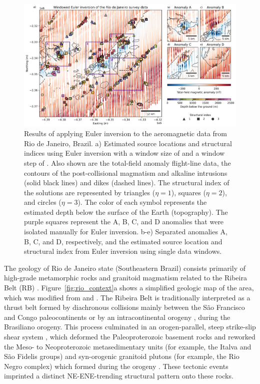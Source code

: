 \begin{figure}[tb!]
\centering
\includegraphics[width=1\linewidth]{figures/real-data-application.png}
\caption{
    Results of applying Euler inversion to the aeromagnetic data from Rio de Janeiro, Brazil. 
    a) Estimated source locations and structural indices using Euler inversion with a window size of \RioWindowSize{} and a window step of \RioWindowStep{}. 
    Also shown are the total-field anomaly flight-line data, the contours of the post-collisional magmatism and alkaline intrusions (solid black lines) and dikes (dashed lines).
    The structural index of the solutions are represented by triangles ($\eta=1$),  squares ($\eta=2$), and circles ($\eta=3$). 
    The color of each symbol represents the estimated depth below the surface of the Earth (topography).
    The purple squares represent the A, B, C, and D anomalies that were isolated manually for Euler inversion.
    b-e) Separated anomalies A, B, C, and D, respectively, and the estimated source location and structural index from Euler inversion using single data windows.
}
\label{fig:rio_results}
\end{figure}

The geology of Rio de Janeiro state (Southeastern Brazil) consists primarily of
high-grade metamorphic rocks and granitoid magmatism related to the Ribeira
Belt (RB) \citep{Heilbron2020}. 
Figure~\ref{fig:rio_context}a shows a simplified geologic map of the area, which was modified from \citet{Heilbron2016} and \citet{Dantas2017}.
The Ribeira Belt is traditionally interpreted as a thrust
belt formed by diachronous collisions mainly between the São Francisco and
Congo paleocontinents \citep{Heilbron2008, Trouw2000} or by an intracontinental
orogeny \citep[\textit{e.g.}][]{Meira2015, Meira2019}, during the Brasiliano
orogeny. This process culminated in an orogen-parallel, steep strike-slip shear
system \citep{EgydioSilva2005}, which deformed the Paleoproterozoic basement
rocks and reworked the Meso- to Neoproterozoic metasedimentary units (for example, the
Italva and São Fidelis groups) and syn-orogenic granitoid plutons (for example, the Rio
Negro complex) which formed during the orogeny \citep{Heilbron2003, Heilbron2020}.
These tectonic events imprinted a distinct NE-ENE-trending structural pattern
onto these rocks.

